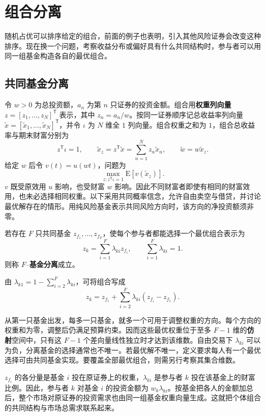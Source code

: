 \section{组合分离}\label{sec:wj-nine-2}
随机占优可以排序给定的组合，前面的例子也表明，引入其他风险证券会改变这种排序。现在换一个问题，考察收益分布或偏好具有什么共同结构时，参与者可以用同一组基金构造各自的最优组合。

\subsection{共同基金分离}
令 $w>0$ 为总投资额，$a_n$ 为第 $n$ 只证券的投资金额。组合用\textbf{权重列向量} $z=[z_1,\ldots,z_N]^{\mathsf T}$ 表示，其中 $z_n=a_n/w$。按同一证券顺序记总收益率列向量 $\tilde x=[\tilde x_1,\ldots,\tilde x_N]^{\mathsf T}$，并令 $\iota$ 为 $N$ 维全 $1$ 列向量。组合权重之和为 $1$，组合总收益率与期末财富分别为
\[
 z^{\mathsf T}\iota=1,\qquad
 \tilde x_z=z^{\mathsf T}\tilde x=\sum_{n=1}^N z_n\tilde x_n,\qquad
 \tilde w=w\tilde x_z.
\]
给定 $w$ 后令 $v(t)=u(wt)$，问题为
\[
 \max_{z:z^{\mathsf T}\iota=1}\mathrm E[v(\tilde x_z)].
\]
$v$ 既受原效用 $u$ 影响，也受财富 $w$ 影响。因此不同财富者即使有相同的财富效用，也未必选择相同权重。以下采用共同概率信念，允许自由卖空与借贷，并讨论最优解存在的情形。用纯风险基金表示共同风险方向时，该方向的净投资额须非零。

\begin{tcolorbox}[knowledge]
 若存在 $F$ 只共同基金 $z_{f_1},\ldots,z_{f_F}$，使每个参与者都能选择一个最优组合表示为
\begin{equation}
 z_k=\sum_{i=1}^F\lambda_{ki}z_{f_i},\qquad
 \sum_{i=1}^F\lambda_{ki}=1.\label{eq:wj-9-1}
\end{equation}
则称 $F$--\textbf{基金分离}成立。
\end{tcolorbox}
由 $\lambda_{k1}=1-\sum_{i=2}^F\lambda_{ki}$，可将组合写成
\[
 z_k=z_{f_1}+\sum_{i=2}^{F}\lambda_{ki}(z_{f_i}-z_{f_1}).
\]

从第一只基金出发，每多一只基金，就多一个可用于调整权重的方向。每个方向的权重和为零，调整后仍满足预算约束。因而这些最优权重位于至多 $F-1$ 维的\textbf{仿射}空间中，只有这 $F-1$ 个差向量线性独立时才达到该维数。自由交易下 $\lambda_{ki}$ 可以为负，分离基金的选择通常也不唯一。若最优解不唯一，定义要求每人有一个最优选择可由共同基金实现。要覆盖全部最优组合，则需另行考察其集合维数。

$z_{f_i}$ 的各分量是基金 $i$ 投在原证券上的权重，$\lambda_{ki}$ 是参与者 $k$ 投在该基金上的财富比例。因此，参与者 $k$ 对基金 $i$ 的投资金额为 $w_k\lambda_{ki}$。按基金把各人的金额加总后，整个市场对原证券的投资需求也由同一组基金权重向量生成。这就把个体组合的共同结构与市场总需求联系起来。


